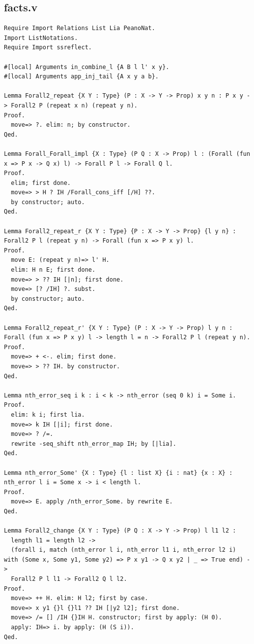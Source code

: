 \subsection*{facts.v}
\begin{lstlisting}
Require Import Relations List Lia PeanoNat.
Import ListNotations.
Require Import ssreflect.

#[local] Arguments in_combine_l {A B l l' x y}.
#[local] Arguments app_inj_tail {A x y a b}.

Lemma Forall2_repeat {X Y : Type} (P : X -> Y -> Prop) x y n : P x y -> Forall2 P (repeat x n) (repeat y n).
Proof.
  move=> ?. elim: n; by constructor.
Qed.

Lemma Forall_Forall_impl {X : Type} (P Q : X -> Prop) l : (Forall (fun x => P x -> Q x) l) -> Forall P l -> Forall Q l.
Proof.
  elim; first done.
  move=> > H ? IH /Forall_cons_iff [/H] ??.
  by constructor; auto.
Qed.

Lemma Forall2_repeat_r {X Y : Type} {P : X -> Y -> Prop} {l y n} : Forall2 P l (repeat y n) -> Forall (fun x => P x y) l.
Proof.
  move E: (repeat y n)=> l' H.
  elim: H n E; first done.
  move=> > ?? IH [|n]; first done.
  move=> [? /IH] ?. subst.
  by constructor; auto.
Qed.

Lemma Forall2_repeat_r' {X Y : Type} (P : X -> Y -> Prop) l y n : Forall (fun x => P x y) l -> length l = n -> Forall2 P l (repeat y n).
Proof.
  move=> + <-. elim; first done.
  move=> > ?? IH. by constructor.
Qed.

Lemma nth_error_seq i k : i < k -> nth_error (seq 0 k) i = Some i.
Proof.
  elim: k i; first lia.
  move=> k IH [|i]; first done.
  move=> ? /=.
  rewrite -seq_shift nth_error_map IH; by [|lia].
Qed.

Lemma nth_error_Some' {X : Type} {l : list X} {i : nat} {x : X} : nth_error l i = Some x -> i < length l.
Proof.
  move=> E. apply /nth_error_Some. by rewrite E.
Qed.

Lemma Forall2_change {X Y : Type} (P Q : X -> Y -> Prop) l l1 l2 :
  length l1 = length l2 ->
  (forall i, match (nth_error l i, nth_error l1 i, nth_error l2 i) with (Some x, Some y1, Some y2) => P x y1 -> Q x y2 | _ => True end) ->
  Forall2 P l l1 -> Forall2 Q l l2.
Proof.
  move=> ++ H. elim: H l2; first by case.
  move=> x y1 {}l {}l1 ?? IH [|y2 l2]; first done.
  move=> /= [] /IH {}IH H. constructor; first by apply: (H 0).
  apply: IH=> i. by apply: (H (S i)).
Qed.


\end{lstlisting}
